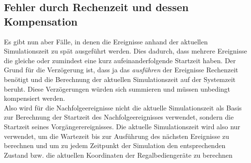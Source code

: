 \subsection{Fehler durch Rechenzeit und dessen Kompensation}
Es gibt nun aber Fälle, in denen die Ereignisse anhand der aktuellen Simulationszeit zu spät ausgeführt werden. Dies dadurch, dass mehrere Ereignisse die gleiche oder zumindest eine kurz aufeinanderfolgende Startzeit haben. Der Grund für die Verzögerung ist, dass ja das \textit{ausführen} der Ereignisse Rechenzeit benötigt und die Berechnung der aktuellen Simulationszeit auf der Systemzeit beruht. Diese Verzögerungen würden sich summieren und müssen unbedingt kompensiert werden.\\
Also wird für die Nachfolgeereignisse nicht die aktuelle Simulationszeit als Basis zur Berechnung der Startzeit des Nachfolgeereignisses verwendet, sondern die Startzeit seines Vorgängerereignisses. Die aktuelle Simulationszeit wird also nur verwendet, um die Wartezeit bis zur Ausführung des nächsten Ereignisse zu berechnen und um zu jedem Zeitpunkt der Simulation den entsprechenden Zustand bzw. die aktuellen Koordinaten der Regalbediengeräte zu berechnen
%

